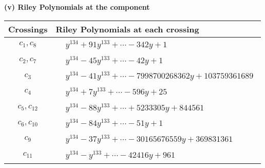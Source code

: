 \documentclass[1p]{elsarticle_modified}
\theoremstyle{definition}
\begin{document}
\newpage\renewcommand{\arraystretch}{1}
\flushleft \textbf{(v) Riley Polynomials at the component}\newline \\
\begin{tabular}{m{50pt}|m{274pt}}
Crossings & \hspace{64pt}Riley Polynomials at each crossing \\
\hline $$\begin{aligned}c_{1},c_{8}\end{aligned}$$&$\begin{aligned}
&y^{134}+91 y^{133}+\cdots-342 y+1
\end{aligned}$\\
\hline $$\begin{aligned}c_{2},c_{7}\end{aligned}$$&$\begin{aligned}
&y^{134}-45 y^{133}+\cdots-42 y+1
\end{aligned}$\\
\hline $$\begin{aligned}c_{3}\end{aligned}$$&$\begin{aligned}
&y^{134}-41 y^{133}+\cdots-7998700268362 y+103759361689
\end{aligned}$\\
\hline $$\begin{aligned}c_{4}\end{aligned}$$&$\begin{aligned}
&y^{134}+7 y^{133}+\cdots-596 y+25
\end{aligned}$\\
\hline $$\begin{aligned}c_{5},c_{12}\end{aligned}$$&$\begin{aligned}
&y^{134}-88 y^{133}+\cdots+5233305 y+844561
\end{aligned}$\\
\hline $$\begin{aligned}c_{6},c_{10}\end{aligned}$$&$\begin{aligned}
&y^{134}-84 y^{133}+\cdots-51 y+1
\end{aligned}$\\
\hline $$\begin{aligned}c_{9}\end{aligned}$$&$\begin{aligned}
&y^{134}-37 y^{133}+\cdots-30165676559 y+369831361
\end{aligned}$\\
\hline $$\begin{aligned}c_{11}\end{aligned}$$&$\begin{aligned}
&y^{134}- y^{133}+\cdots-42416 y+961
\end{aligned}$\\
\hline
\end{tabular}\\~\\
\end{document}
